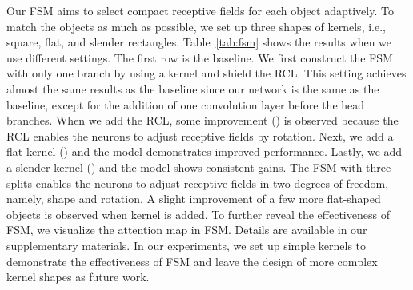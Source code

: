 \documentclass[10pt,twocolumn,letterpaper]{article}
\begin{document}
Our FSM aims to select compact receptive fields for each object adaptively.
To match the objects as much as possible, we set up three shapes of kernels, i.e., square, flat, and slender rectangles.
Table~\ref{tab:fsm} shows the results when we use different settings.
The first row is the baseline.
We first construct the FSM with only one branch by using a  kernel and shield the RCL.
This setting achieves almost the same results as the baseline since our network is the same as the baseline, except for the addition of one convolution layer before the head branches.
When we add the RCL, some improvement () is observed because the RCL enables the neurons to adjust receptive fields by rotation.
Next, we add a flat kernel () and the model demonstrates improved performance.
Lastly, we add a slender kernel () and the model shows consistent gains.
The FSM with three splits enables the neurons to adjust receptive fields in two degrees of freedom, namely, shape and rotation.
A slight improvement of a few more flat-shaped objects is observed when  kernel is added.
To further reveal the effectiveness of FSM, we visualize the attention map in FSM.
Details are available in our supplementary materials.
In our experiments, we set up simple kernels to demonstrate the effectiveness of FSM and leave the design of more complex kernel shapes as future work.
\end{document}
